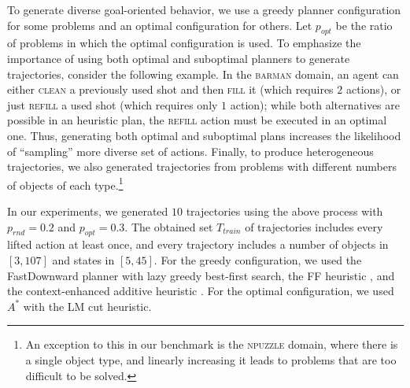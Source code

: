 \documentclass[letterpaper]{article} %
\newcommand{\T}{T}
\newcommand{\Ttrain}{\T_{train}}
\newif\ifaddcomments
\newcommand{\roni}[1]{\ifaddcomments{\textcolor{red}{[Roni: #1]}}\fi}
\newcommand{\leo}[1]{\ifaddcomments{\textcolor{pink}{[Leonardo: #1]}}\fi}
\begin{document}
To generate diverse goal-oriented behavior, we use a greedy planner configuration for some problems and an optimal configuration for others. 
Let $p_{opt}$ be the ratio of problems in which the optimal configuration is used. 
To emphasize the importance of using both optimal and suboptimal planners to generate trajectories, consider the following example. 
In the \textsc{barman} domain, an agent can either \textsc{clean} a previously used shot and then \textsc{fill} it (which requires $2$ actions), or just \textsc{refill} a used shot (which requires only $1$ action); while both alternatives are possible in an heuristic plan, the \textsc{refill} action must be executed in an optimal one. 
Thus, generating both optimal and suboptimal plans increases the likelihood of ``sampling'' more diverse set of actions. 
Finally, to produce heterogeneous trajectories, we also generated trajectories from problems with different numbers of objects of each type.\footnote{An exception to this in our benchmark is the \textsc{npuzzle} domain, where there is a single object type, and linearly increasing it leads to problems that are too difficult to be solved.} 


%


In our experiments, we generated $10$ trajectories using the above process with $p_{rnd}=0.2$ and $p_{opt}=0.3$. 
The obtained set $\Ttrain$ of trajectories includes every lifted action at least once, and every trajectory includes a number of objects in $[3, 107]$ and states in $[5, 45]$. %
For the greedy configuration, we used the FastDownward planner \citep{helmert2006fast} with lazy greedy best-first search, the
FF heuristic \citep{hoffmann2001ff}, and the context-enhanced additive heuristic \citep{helmert2008unifying}. For the optimal configuration, we used $A^*$ with the LM cut heuristic. %





\end{document}
